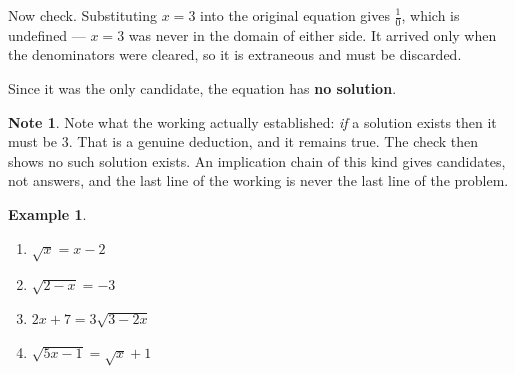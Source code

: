 \documentclass[11pt,a4paper]{article}
\theoremstyle{definition}
\newtheorem{example}[thm]{Example}
\newtheorem{note}[thm]{Note}
\begin{document}
Now check. Substituting $x=3$ into the original equation gives $\frac{1}{0}$, which
is undefined --- $x=3$ was never in the domain of either side. It arrived only when
the denominators were cleared, so it is extraneous and must be discarded.

Since it was the only candidate, the equation has \textbf{no solution}.

\begin{note}
Note what the working actually established: \emph{if} a solution exists then it
must be $3$. That is a genuine deduction, and it remains true. The check then shows
no such solution exists. An implication chain of this kind gives candidates, not
answers, and the last line of the working is never the last line of the problem.
\end{note}

\begin{example}

\begin{enumerate}
\item[(a).] $\sqrt{x}=x-2$
\item[(b).] $\sqrt{2-x}=-3$
\item[(c).] $2x+7=3\sqrt{3-2x}$
\item[(d).] $\sqrt{5x-1}=\sqrt{x}+1$
\end{enumerate}
\end{example}
\end{document}
